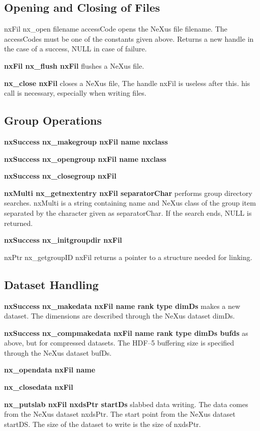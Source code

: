 \documentclass[12pt,a4paper]{article}
\begin{document}
\subsection{Opening and Closing of Files} 
{nxFil nx\_open filename accessCode} opens the NeXus file filename. The
accessCodes must be one of the constants given above. Returns a new
handle in the case of a success, NULL in case of failure.

{\bf nxFil nx\_flush nxFil} flushes a NeXus file.

{\bf nx\_close nxFil} closes a NeXus file, The handle nxFil is useless
after this. his call is necessary, especially when writing files. 


\subsection{Group Operations}
{\bf nxSuccess nx\_makegroup nxFil name nxclass}

{\bf nxSuccess nx\_opengroup nxFil name nxclass}

{\bf nxSuccess nx\_closegroup nxFil}

{\bf nxMulti nx\_getnextentry nxFil separatorChar} performs group
directory searches. nxMulti is a string containing name and NeXus
class of the group item separated by the character given as
separatorChar. If the search ends, NULL is returned.  

{\bf nxSuccess nx\_initgroupdir nxFil}
 
{nxPtr nx\_getgroupID nxFil} returns a pointer to a structure needed
for linking. 


\subsection{Dataset Handling}

{\bf nxSuccess nx\_makedata nxFil  name rank type dimDs}
makes a new dataset. The dimensions are described through the NeXus
dataset dimDs.
 
{\bf nxSuccess nx\_compmakedata nxFil  name rank type dimDs bufds}
as above, but for compressed datasets. The HDF--5 buffering size is
specified through the NeXus dataset bufDs.

{\bf nx\_opendata nxFil name}

{\bf nx\_closedata nxFil}

{\bf nx\_putslab nxFil nxdsPtr  startDs}  slabbed data writing. The
data comes from the NeXus dataset nxdsPtr. The start point from the
NeXus dataset startDS. The size of the dataset to write is the size of
nxdsPtr.  
\end{document}
